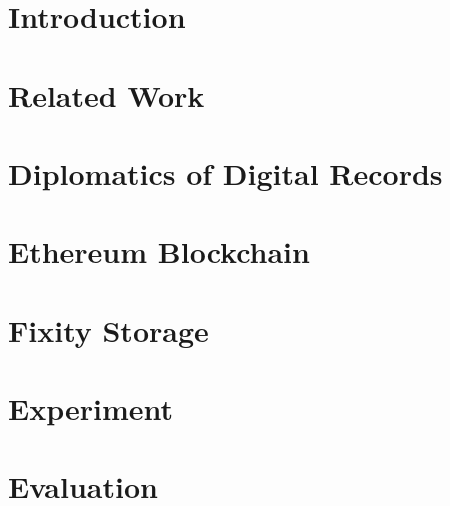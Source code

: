 \documentclass[final]{vutinfth} %
\begin{document}
\frontmatter %

\addstatementpage

\begin{kurzfassung}

\end{kurzfassung}

\begin{abstract}

\end{abstract}


\tableofcontents %

\mainmatter

\chapter{Introduction}

\chapter{Related Work}

\chapter{Diplomatics of Digital Records}
\label{ch:diplomatics}


\chapter{Ethereum Blockchain}
\label{ch:ethereum}

\chapter{Fixity Storage}
\label{ch:fixity-storage}

\chapter{Experiment}
\label{ch:experiment}

\chapter{Evaluation}
\label{ch:evaluation}

\end{document}
